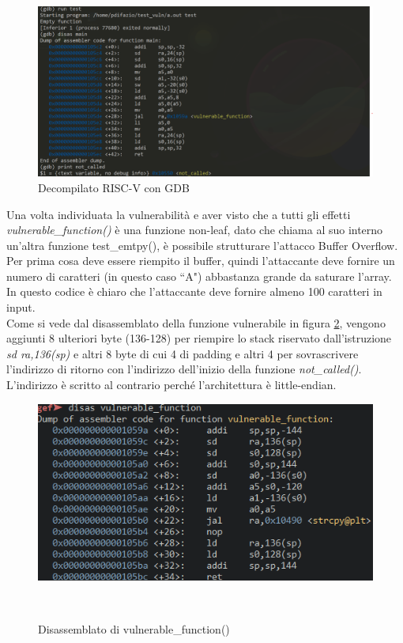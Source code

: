 \begin{figure}[!htbp]
    \centering
    \includegraphics[width=0.9\linewidth]{images/gdb_riscv.png}
    \caption{Decompilato RISC-V con GDB}
    \label{ref:riscv-decompiled}
\end{figure}
\FloatBarrier
\vspace{1cm}
Una volta individuata la vulnerabilità e aver visto che a tutti gli effetti \textit{vulnerable\_function()} è una funzione non-leaf, dato che chiama al suo interno un'altra funzione test\_emtpy(), è possibile strutturare l'attacco Buffer Overflow.\\
Per prima cosa deve essere riempito il buffer, quindi l'attaccante deve fornire un numero di caratteri (in questo caso ``A") abbastanza grande da saturare l'array. In questo codice è chiaro che l'attaccante deve fornire almeno 100 caratteri in input.\\
Come si vede dal disassemblato della funzione vulnerabile in figura \ref{ref:vuln-function}, vengono aggiunti 8 ulteriori byte (136-128) per riempire lo stack riservato dall'istruzione \textit{sd  ra,136(sp)} e altri 8 byte di cui 4 di padding e altri 4 per sovrascrivere l'indirizzo di ritorno con l'indirizzo dell'inizio della funzione \textit{not\_called()}. L'indirizzo è scritto al contrario perché l'architettura è little-endian.
\vspace{1cm}
\FloatBarrier
\begin{figure}[!htbp]
    \centering
    \includegraphics[width=0.6\linewidth]{images/vulnerable-function.png}
    \caption{Disassemblato di vulnerable\_function()}\
    \label{ref:vuln-function}
\end{figure}
